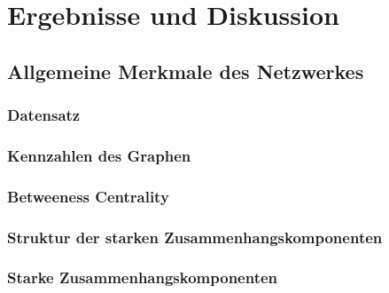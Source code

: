
\chapter{Ergebnisse und Diskussion}
\label{ch:Ergebnisse}

\section{Allgemeine Merkmale des Netzwerkes}
\label{sec:result-allg-merkm-des}

\subsection{Datensatz}
\label{sec:datensatz}

\subsection{Kennzahlen des Graphen}
\label{sec:kennz-des-graph}

\subsection{Betweeness Centrality}
\label{sec:betw-centr}

\subsection{Struktur der starken Zusammenhangskomponenten}
\label{sec:struktur-der-starken}

\subsection{Starke Zusammenhangskomponenten}
\label{sec:result-komponentenstruktur}

